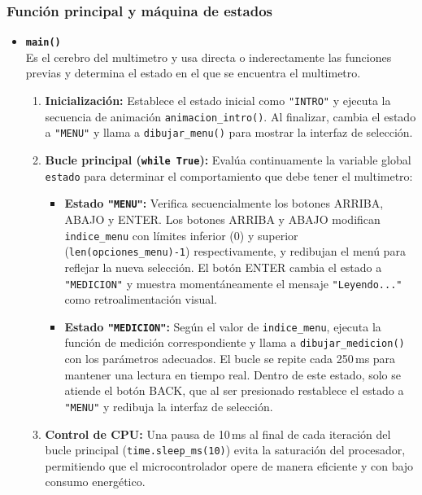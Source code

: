 \documentclass[letterpaper,12pt]{article}
\begin{document}
    \subsubsection{Función principal y máquina de estados}

    \begin{itemize}
        \item \textbf{\texttt{main()}} \\
        Es el cerebro del multimetro y usa directa o inderectamente las funciones previas y determina el estado en el que se encuentra el multimetro.
        \begin{enumerate}
            \item \textbf{Inicialización:} Establece el estado inicial como \texttt{"INTRO"} y ejecuta la secuencia de animación \texttt{animacion\_intro()}. Al finalizar, cambia el estado a \texttt{"MENU"} y llama a \texttt{dibujar\_menu()} para mostrar la interfaz de selección.
            \item \textbf{Bucle principal (\texttt{while True}):} Evalúa continuamente la variable global \texttt{estado} para determinar el comportamiento que debe tener el multimetro:
            \begin{itemize}
                \item \textbf{Estado \texttt{"MENU"}:} Verifica secuencialmente los botones ARRIBA, ABAJO y ENTER. Los botones ARRIBA y ABAJO modifican \texttt{indice\_menu} con límites inferior (0) y superior (\texttt{len(opciones\_menu)-1}) respectivamente, y redibujan el menú para reflejar la nueva selección. El botón ENTER cambia el estado a \texttt{"MEDICION"} y muestra momentáneamente el mensaje \texttt{"Leyendo..."} como retroalimentación visual.
                \item \textbf{Estado \texttt{"MEDICION"}:} Según el valor de \texttt{indice\_menu}, ejecuta la función de medición correspondiente y llama a \texttt{dibujar\_medicion()} con los parámetros adecuados. El bucle se repite cada 250\,ms para mantener una lectura en tiempo real. Dentro de este estado, solo se atiende el botón BACK, que al ser presionado restablece el estado a \texttt{"MENU"} y redibuja la interfaz de selección.
            \end{itemize}
            \item \textbf{Control de CPU:} Una pausa de 10\,ms al final de cada iteración del bucle principal (\texttt{time.sleep\_ms(10)}) evita la saturación del procesador, permitiendo que el microcontrolador opere de manera eficiente y con bajo consumo energético.
        \end{enumerate}
    \end{itemize}
\end{document}
